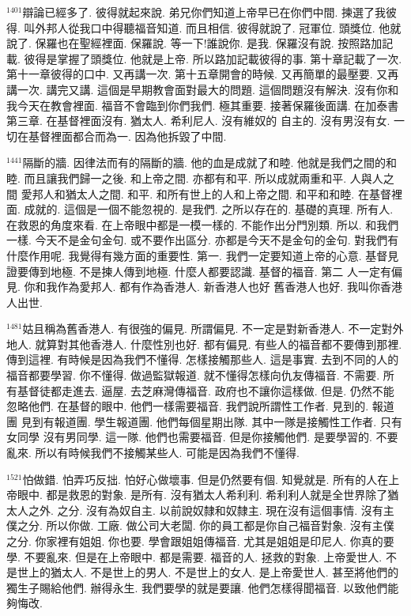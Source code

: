 \documentclass{book}
\begin{document}
$^{1401}$辯論已經多了.
彼得就起來說.
弟兄你們知道上帝早已在你們中間.
揀選了我彼得.
叫外邦人從我口中得聽福音知道.
而且相信.
彼得就說了.
冠軍位.
頭獎位.
他就說了.
保羅也在聖經裡面.
保羅說.
等一下!誰說你.
是我.
保羅沒有說.
按照路加記載.
彼得是掌握了頭獎位.
他就是上帝.
所以路加記載彼得的事.
第十章記載了一次.
第十一章彼得的口中.
又再講一次.
第十五章開會的時候.
又再簡單的最壓要.
又再講一次.
講完又講.
這個是早期教會面對最大的問題.
這個問題沒有解決.
沒有你和我今天在教會裡面.
福音不會臨到你們我們.
極其重要.
接著保羅後面講.
在加泰書第三章.
在基督裡面沒有.
猶太人.
希利尼人.
沒有維奴的 自主的.
沒有男沒有女.
一切在基督裡面都合而為一.
因為他拆毀了中間.

$^{1441}$隔斷的牆.
因律法而有的隔斷的牆.
他的血是成就了和睦.
他就是我們之間的和睦.
而且讓我們歸一之後.
和上帝之間.
亦都有和平.
所以成就兩重和平.
人與人之間 愛邦人和猶太人之間.
和平.
和所有世上的人和上帝之間.
和平和和睦.
在基督裡面.
成就的.
這個是一個不能忽視的.
是我們.
之所以存在的.
基礎的真理.
所有人.
在救恩的角度來看.
在上帝眼中都是一模一樣的.
不能作出分門別類.
所以.
和我們一樣.
今天不是金句金句.
或不要作出區分.
亦都是今天不是金句的金句.
對我們有什麼作用呢.
我覺得有幾方面的重要性.
第一.
我們一定要知道上帝的心意.
基督見證要傳到地極.
不是揀人傳到地極.
什麼人都要認識.
基督的福音.
第二 人一定有偏見.
你和我作為愛邦人.
都有作為香港人.
新香港人也好 舊香港人也好.
我叫你香港人出世.

$^{1481}$姑且稱為舊香港人.
有很強的偏見.
所謂偏見.
不一定是對新香港人.
不一定對外地人.
就算對其他香港人.
什麼性別也好.
都有偏見.
有些人的福音都不要傳到那裡.
傳到這裡.
有時候是因為我們不懂得.
怎樣接觸那些人.
這是事實.
去到不同的人的福音都要學習.
你不懂得.
做過監獄報道.
就不懂得怎樣向仇友傳福音.
不需要.
所有基督徒都走進去.
逼屋.
去芝麻灣傳福音.
政府也不讓你這樣做.
但是.
仍然不能忽略他們.
在基督的眼中.
他們一樣需要福音.
我們說所謂性工作者.
見到的.
報道團 見到有報道團.
學生報道團.
他們每個星期出隊.
其中一隊是接觸性工作者.
只有女同學 沒有男同學.
這一隊.
他們也需要福音.
但是你接觸他們.
是要學習的.
不要亂來.
所以有時候我們不接觸某些人.
可能是因為我們不懂得.

$^{1521}$怕做錯.
怕弄巧反拙.
怕好心做壞事.
但是仍然要有個.
知覺就是.
所有的人在上帝眼中.
都是救恩的對象.
是所有.
沒有猶太人希利利.
希利利人就是全世界除了猶太人之外.
之分.
沒有為奴自主.
以前說奴隸和奴隸主.
現在沒有這個事情.
沒有主僕之分.
所以你做.
工廠.
做公司大老闆.
你的員工都是你自己福音對象.
沒有主僕之分.
你家裡有姐姐.
你也要.
學會跟姐姐傳福音.
尤其是姐姐是印尼人.
你真的要學.
不要亂來.
但是在上帝眼中.
都是需要.
福音的人.
拯救的對象.
上帝愛世人.
不是世上的猶太人.
不是世上的男人.
不是世上的女人.
是上帝愛世人.
甚至將他們的獨生子賜給他們.
辦得永生.
我們要學的就是要讓.
他們怎樣得聞福音.
以致他們能夠悔改.
\end{document}
